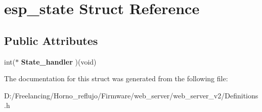 \hypertarget{structesp__state}{}\section{esp\+\_\+state Struct Reference}
\label{structesp__state}
\subsection*{Public Attributes}
\begin{DoxyCompactItemize}
\item 
\mbox{\label{structesp__state_a2bf0a9ededc6165e99f7932b611d3b63}} 
int($\ast$ {\bfseries State\+\_\+handler} )(void)
\end{DoxyCompactItemize}


The documentation for this struct was generated from the following file\+:\begin{DoxyCompactItemize}
\item 
D\+:/\+Freelancing/\+Horno\+\_\+reflujo/\+Firmware/web\+\_\+server/web\+\_\+server\+\_\+v2/Definitions.\+h\end{DoxyCompactItemize}
